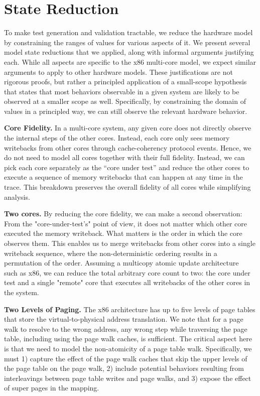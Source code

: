 
\section{State Reduction}\label{sec:reduction} %

To make test generation and validation tractable, we reduce the hardware model by constraining the ranges of values for various aspects of it. 
We present several model state reductions that we applied, along with informal arguments justifying each. While all aspects are specific to the x86 multi-core model, we expect similar arguments to apply to other hardware models.
These justifications are not rigorous proofs, but rather a principled application of a small-scope hypothesis~\cite{Jackson:2002:Alloy} that states that most behaviors observable in a given system are likely to be observed at a smaller scope as well. Specifically, by constraining the domain of values in a principled way, we can still observe the relevant hardware behavior.

\noindent\textbf{Core Fidelity.} 
In a multi-core system, any given core does not directly observe the internal steps of the other cores.
Instead, each core only sees memory writebacks from other cores through cache-coherency protocol events.
Hence, we do not need to model all cores together with their full fidelity. Instead, we can pick each core separately as the ``core under test'' and reduce the other cores to execute a sequence of memory writebacks that can happen at any time in the trace. This breakdown preserves the overall fidelity of all cores while simplifying analysis.


\noindent\textbf{Two cores.}
By reducing the core fidelity, we can make a second observation: 
From the "core-under-test's" point of view, it does not matter which other core executed the memory writeback. 
What matters is the order in which the core observes them.
This enables us to merge writebacks from other cores into a single writeback sequence, where the non-deterministic ordering results in a permutation of the order. 
Assuming a multicopy atomic update architecture~\cite{Coughlin:2023:NonMultiCopyUpdates} such as x86, we can reduce the total arbitrary core count to two: the core under test and a single "remote" core that executes all writebacks of the other cores in the system.


\noindent\textbf{Two Levels of Paging.}
The x86 architecture has up to five levels of page tables that store the virtual-to-physical address translation. 
We note that for a page walk to resolve to the wrong address, any wrong step while traversing the page table, including using the page walk caches, is sufficient. 
The critical aspect here is that we need to model the non-atomicity of a page table walk. Specifically,  we must 1) capture the effect of the page walk caches that skip the upper levels of the page table on the page walk, 2) include potential behaviors resulting from interleavings between page table writes and page walks, and 3) expose the effect of super pages in the mapping. 

